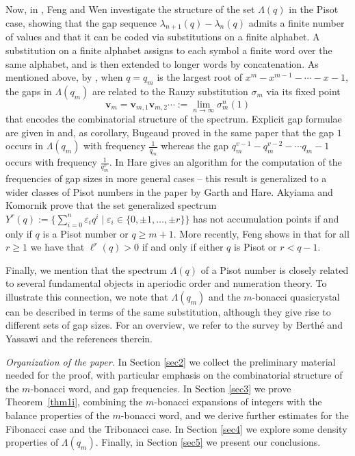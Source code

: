 \documentclass{amsart}
\begin{document}
Now, in \cite{FW02}, Feng and Wen investigate the structure of the set $\Lambda(q)$ in the Pisot case, showing that the gap sequence $\lambda_{n+1}(q)-\lambda_n(q)$ admits a finite number of values and that it can be coded via substitutions on a finite alphabet. A substitution on a finite alphabet assigns to each symbol a finite word over the same alphabet, and is then extended to longer words by concatenation. As mentioned above, by \cite{FW02,bug02}, 
when $q=q_m$ is the largest root of $x^m-x^{m-1}-\cdots-x-1$, the gaps in $\Lambda(q_m)$ are related to the Rauzy substitution $\sigma_m$
via its fixed point 
$$\mathbf v_{m}=\mathbf v_{m,1}\mathbf v_{m,2}\cdots:=\lim_{n\to\infty} \sigma_m^n(1)$$
that encodes the combinatorial structure of the spectrum. Explicit gap formulae are given in \cite{bug02} and, as corollary, Bugeaud proved in the same paper that the gap $1$ occurs in $\Lambda(q_m)$ with frequency $\frac{1}{q_m}$ whereas the gap 
$q_m^{v-1}-q_m^{v-2}-\cdots q_m-1$ occurs with frequency $\frac{1}{q_m^{v}}$. In \cite{H04} Hare gives an algorithm for the computation of the frequencies of gap sizes in more general cases -- this result is generalized to a wider classes of Pisot numbers in the paper \cite{GH06} by Garth and Hare. Akyiama and Komornik \cite{AK13} prove that the set generalized spectrum $Y^r(q):=\{\sum_{i=0}^n\varepsilon_i q^i\mid \varepsilon_i\in\{0,\pm 1,\dots,\pm r\}\}$ has not accumulation points if and only if $q$ is a Pisot number or $q\geq m+1$.   More recently, Feng  shows in \cite{F16} that for all $r\geq 1$ we have that $\ell^r(q)>0$ if and only if either $q$ is Pisot or $r<q-1$. 

Finally, we mention that the spectrum $\Lambda(q)$ of a Pisot number
is closely related to several fundamental objects in aperiodic order
and numeration theory. To illustrate this connection, we note that
$\Lambda(q_m)$ and the $m$-bonacci quasicrystal can be described in terms of the same substitution, although they give rise to different sets of gap sizes. For an overview, we refer to the survey by Berthé and Yassawi \cite{BY24} and the references therein.
\medskip

\emph{Organization of the paper.}
In Section \ref{sec2} we collect the preliminary material needed for the proof,
with particular emphasis on the combinatorial structure of the
$m$-bonacci word, and gap frequencies.
In Section \ref{sec3} we prove Theorem~\ref{thm1i}, combining the
$m$-bonacci expansions of integers with the balance properties of the $m$-bonacci word,  and we derive further estimates  for the Fibonacci case and the Tribonacci case. 
In Section \ref{sec4} we explore some density properties of
$\Lambda(q_m)$. 
Finally, in Section \ref{sec5} we present our conclusions.
\end{document}
